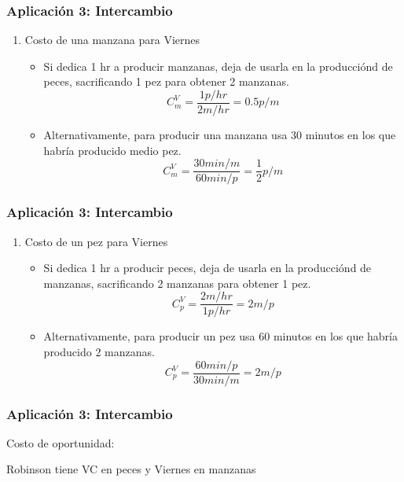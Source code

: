 \documentclass[dvipsnames,table]{beamer}
\newcommand{\peq}[1]{{\scriptscriptstyle{#1}}}
\newcounter{sauvegardeenumi}
\newcommand{\asuivre}{\setcounter{sauvegardeenumi}{\theenumi}}
\newcommand{\suite}{\setcounter{enumi}{\thesauvegardeenumi}}
\begin{document}
		\begin{frame}
			\frametitle{Aplicación 3: Intercambio}
			\begin{enumerate}
			\suite
				\item Costo de una manzana para Viernes
					\begin{itemize}
						\item Si dedica 1 hr a producir manzanas, deja de usarla en la producciónd de peces, sacrificando 1 pez para obtener 2 manzanas. $$C^ \peq{V}_\peq{m}=\frac{1 \peq{p/hr}}{2 \peq{m/hr}}=0.5 \peq{p/m}$$
						\item Alternativamente, para producir una manzana usa 30 minutos en los que habría producido medio pez. $$C^ \peq{V}_\peq{m}=\frac{30 \peq{min/m}}{60 \peq{min/p}}=\frac{1}{2} \peq{p/m}$$
					\end{itemize}
				\asuivre
			\end{enumerate}
		\end{frame}
		
		\begin{frame}
			\frametitle{Aplicación 3: Intercambio}
			\begin{enumerate}
			\suite
				\item Costo de un pez para Viernes
					\begin{itemize}
						\item Si dedica 1 hr a producir peces, deja de usarla en la producciónd de manzanas, sacrificando 2 manzanas para obtener 1 pez. $$C^ \peq{V}_\peq{p}=\frac{2 \peq{m/hr}}{1 \peq{p/hr}}=2 \peq{m/p}$$
						\item Alternativamente, para producir un pez usa 60 minutos en los que habría producido 2 manzanas. $$C^ \peq{V}_\peq{p}=\frac{60 \peq{min/p}}{30 \peq{min/m}}=2 \peq{m/p}$$
					\end{itemize}
			\end{enumerate}
		\end{frame}		

		\begin{frame}
			\frametitle{Aplicación 3: Intercambio}
			Costo de oportunidad:
			\begin{table}[htbp!]
				\centering
			\end{table}
			Robinson tiene VC en peces y Viernes en manzanas
		\end{frame}
\end{document}
